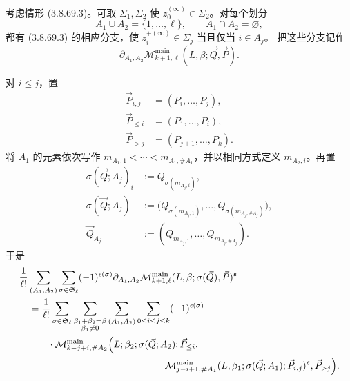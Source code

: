 考虑情形 (3.8.69.3)。可取 $\Sigma_1,\Sigma_2$ 使
$z_0^{(\infty)}\in\Sigma_2$。对每个划分
\[
 A_1\cup A_2=\{1,\ldots,\ell\},
 \qquad A_1\cap A_2=\varnothing,
\]
都有 (3.8.69.3) 的相应分支，使
$z_i^{+(\infty)}\in\Sigma_j$ 当且仅当 $i\in A_j$。
把这些分支记作
\[
 \partial_{A_1,A_2}
 \mathcal M_{k+1,\ell}^{\mathrm{main}}
 (L,\beta;\vec Q,\vec P).
\]

对 $i\leq j$，置
\[
\begin{aligned}
 \vec P_{i,j}&=(P_i,\ldots,P_j),\\
 \vec P_{\leq i}&=(P_1,\ldots,P_i),\\
 \vec P_{>j}&=(P_{j+1},\ldots,P_k).
\end{aligned}
\]
将 $A_1$ 的元素依次写作
$m_{A_1,1}<\cdots<m_{A_1,\#A_1}$，并以相同方式定义
$m_{A_2,i}$。再置
\[
\begin{aligned}
 \sigma(\vec Q;A_j)_i
 &:=
 Q_{\sigma(m_{A_j,i})},\\
 \sigma(\vec Q;A_j)
 &:=
 \bigl(
 Q_{\sigma(m_{A_j,1})},\ldots,
 Q_{\sigma(m_{A_j,\#A_j})}
 \bigr),\\
 \vec Q_{A_j}
 &:=
 (Q_{m_{A_j,1}},\ldots,Q_{m_{A_j,\#A_j}}).
\end{aligned}
\]
于是
\[
\begin{aligned}
&\frac1{\ell!}
 \sum_{(A_1,A_2)}
 \sum_{\sigma\in\mathfrak S_\ell}
 (-1)^{\epsilon(\sigma)}
 \partial_{A_1,A_2}
 \mathcal M_{k+1,\ell}^{\mathrm{main}}
 (L,\beta;\sigma(\vec Q),\vec P)^{\mathfrak s}\\
&\quad=
 \frac1{\ell!}
 \sum_{\sigma\in\mathfrak S_\ell}
 \sum_{\substack{\beta_1+\beta_2=\beta\\\beta_1\ne0}}
 \sum_{(A_1,A_2)}
 \sum_{0\leq i\leq j\leq k}
 (-1)^{\epsilon(\sigma)}\\
&\qquad\quad\cdot
 \mathcal M_{k-j+i,\#A_2}^{\mathrm{main}}
 \Bigl(
 L;\beta_2;\sigma(\vec Q;A_2);
 \vec P_{\leq i},\\
&\hspace{53mm}
 \mathcal M_{j-i+1,\#A_1}^{\mathrm{main}}
 (L,\beta_1;\sigma(\vec Q;A_1);\vec P_{i,j})^{\mathfrak s},
 \vec P_{>j}
 \Bigr).
\end{aligned}
\]
